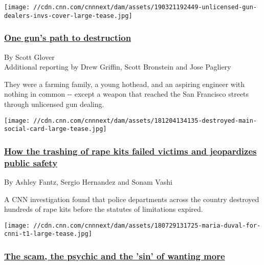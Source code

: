 \href{https://www.cnn.com/interactive/2019/03/us/unlicensed-gun-dealers-invs/index.html}{}

\texttt{[image: //cdn.cnn.com/cnnnext/dam/assets/190321192449-unlicensed-gun-dealers-invs-cover-large-tease.jpg]}

\hypertarget{one-guns-path-to-destruction}{%
\subsubsection{\texorpdfstring{\href{https://www.cnn.com/interactive/2019/03/us/unlicensed-gun-dealers-invs/index.html}{One
gun's path to
destruction}}{One gun's path to destruction}}\label{one-guns-path-to-destruction}}

By Scott Glover\\
Additional reporting by Drew Griffin, Scott Bronstein and Jose Pagliery

They were a farming family, a young hothead, and an aspiring engineer
with nothing in common -\/- except a weapon that reached the San
Francisco streets through unlicensed gun dealing.

\href{https://www.cnn.com/destroyed}{}

\texttt{[image: //cdn.cnn.com/cnnnext/dam/assets/181204134135-destroyed-main-social-card-large-tease.jpg]}

\hypertarget{how-the-trashing-of-rape-kits-failed-victims-and-jeopardizes-public-safety}{%
\subsubsection{\texorpdfstring{\href{https://www.cnn.com/destroyed}{How
the trashing of rape kits failed victims and jeopardizes public
safety}}{How the trashing of rape kits failed victims and jeopardizes public safety}}\label{how-the-trashing-of-rape-kits-failed-victims-and-jeopardizes-public-safety}}

By Ashley Fantz, Sergio Hernandez and Sonam Vashi

A CNN investigation found that police departments across the country
destroyed hundreds of rape kits before the statutes of limitations
expired.

\href{https://www.cnn.com/interactive/2018/07/investigates/maria-duval-psychic-scam-invs/index.html}{}

\texttt{[image: //cdn.cnn.com/cnnnext/dam/assets/180729131725-maria-duval-for-cnni-t1-large-tease.jpg]}

\hypertarget{the-scam-the-psychic-and-the-sin-of-wanting-more}{%
\subsubsection{\texorpdfstring{\href{https://www.cnn.com/interactive/2018/07/investigates/maria-duval-psychic-scam-invs/index.html}{The
scam, the psychic and the 'sin' of wanting
more}}{The scam, the psychic and the 'sin' of wanting more}}\label{the-scam-the-psychic-and-the-sin-of-wanting-more}}

